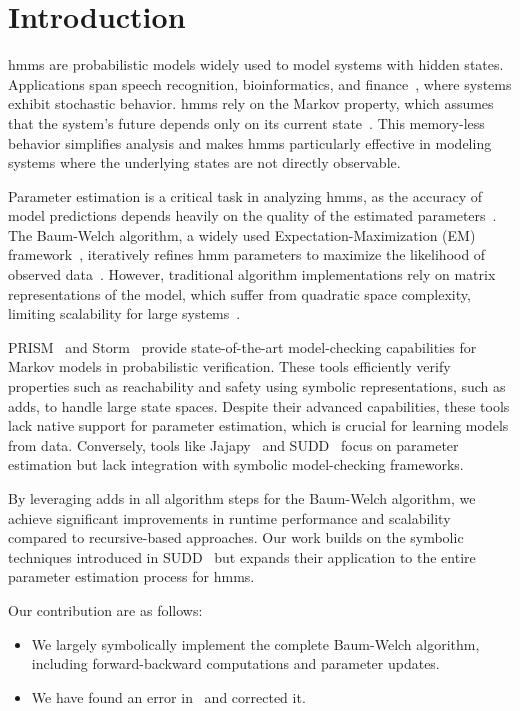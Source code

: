 \section{Introduction}\label{sec:introduction}
\glspl{hmm} are probabilistic models widely used to model systems with hidden states. 
Applications span speech recognition, bioinformatics, and finance~\cite{chavan2013overview,ciocchetta2009bio, mamon2007hidden}, where systems exhibit stochastic behavior. 
\glspl{hmm} rely on the Markov property, which assumes that the system's future depends only on its current state~\cite{baum1966statistical}. 
This memory-less behavior simplifies analysis and makes \glspl{hmm} particularly effective in modeling systems where the underlying states are not directly observable.

Parameter estimation is a critical task in analyzing \glspl{hmm}, as the accuracy of model predictions depends heavily on the quality of the estimated parameters~\cite{bacci2023mm}. 
The Baum-Welch algorithm, a widely used Expectation-Maximization (EM) framework~\cite{kenny2014deep}, iteratively refines \gls{hmm} parameters to maximize the likelihood of observed data~\cite{levinson1983introduction}. 
However, traditional algorithm implementations rely on matrix representations of the model, which suffer from quadratic space complexity, limiting scalability for large systems~\cite{davis2004comparing}.



PRISM~\cite{kwiatkowska2011prism} and Storm~\cite{hensel2021probabilistic} provide state-of-the-art model-checking capabilities for Markov models in probabilistic verification. 
These tools efficiently verify properties such as reachability and safety using symbolic representations, such as \glspl{add}, to handle large state spaces. 
Despite their advanced capabilities, these tools lack native support for parameter estimation, which is crucial for learning models from data. 
Conversely, tools like Jajapy~\cite{reynouard2023jajapy} and SUDD~\cite{p7} focus on parameter estimation but lack integration with symbolic model-checking frameworks.

By leveraging \glspl{add} in all algorithm steps for the Baum-Welch algorithm, we achieve significant improvements in runtime performance and scalability compared to recursive-based approaches. 
Our work builds on the symbolic techniques introduced in SUDD~\cite{p7} but expands their application to the entire parameter estimation process for \glspl{hmm}. 

Our contribution are as follows:
\begin{itemize}
    \item We largely symbolically implement the complete Baum-Welch algorithm, including forward-backward computations and parameter updates.
    \item We have found an error in~\cite{p7} and corrected it.
\end{itemize}

